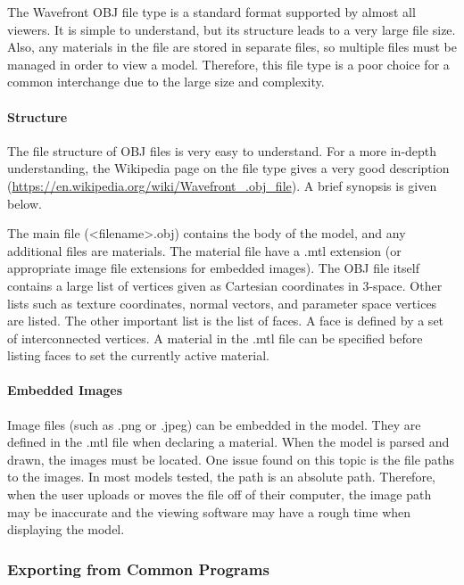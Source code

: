             The Wavefront OBJ file type is a standard format supported by almost all viewers.  It is simple to understand, but its structure leads to a very large file size.  Also, any materials in the file are stored in separate files, so multiple files must be managed in order to view a model.  Therefore, this file type is a poor choice for a common interchange due to the large size and complexity.

            \paragraph{Structure}

                The file structure of OBJ files is very easy to understand.  For a more in-depth understanding, the Wikipedia page on the file type gives a very good description (\url{https://en.wikipedia.org/wiki/Wavefront_.obj_file}).  A brief synopsis is given below.

                The main file (<filename>.obj) contains the body of the model, and any additional files are materials.  The material file have a .mtl extension (or appropriate image file extensions for embedded images).  The OBJ file itself contains a large list of vertices given as Cartesian coordinates in 3-space.  Other lists such as texture coordinates, normal vectors, and parameter space vertices are listed.  The other important list is the list of faces.  A face is defined by a set of interconnected vertices.  A material in the .mtl file can be specified before listing faces to set the currently active material.

            \paragraph{Embedded Images}

                Image files (such as .png or .jpeg) can be embedded in the model.  They are defined in the .mtl file when declaring a material.  When the model is parsed and drawn, the images must be located.  One issue found on this topic is the file paths to the images.  In most models tested, the path is an absolute path.  Therefore, when the user uploads or moves the file off of their computer, the image path may be inaccurate and the viewing software may have a rough time when displaying the model.

        \subsubsection{Exporting from Common Programs}

